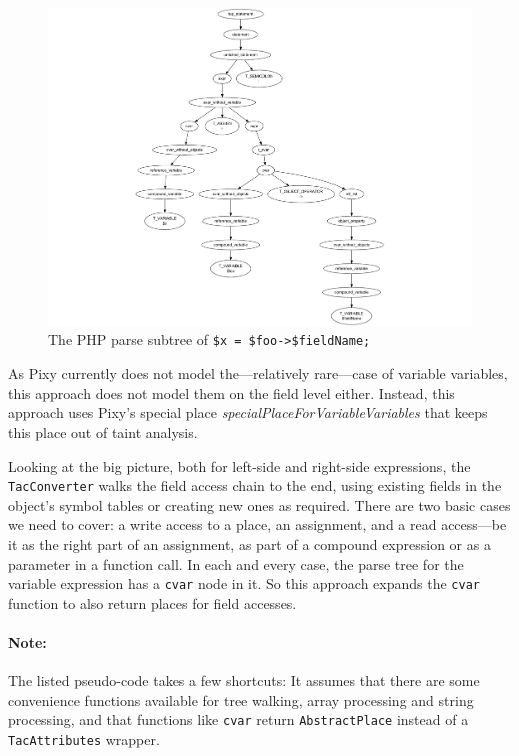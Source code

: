 \begin{figure}[htb]
  \begin{center}
    \includegraphics[scale=.9, trim=60mm 0mm 0mm 0mm]{images/variable-field-access-right}
    \caption{The PHP parse subtree of \texttt{\$x = \$foo->\$fieldName;}}
    \label{fig:variable-field-access-right}
  \end{center}
\end{figure}

As Pixy currently does not model the---relatively rare---case of variable variables, this approach does not model them on the field level either. Instead, this approach uses Pixy's special place \emph{specialPlaceForVariableVariables} that keeps this place out of taint analysis.

Looking at the big picture, both for left-side and right-side expressions, the \texttt{TacConverter} walks the field access chain to the end, using existing fields in the object's symbol tables or creating new ones as required. There are two basic cases we need to cover: a write access to a place, \ie an assignment, and a read access---be it as the right part of an assignment, as part of a compound expression or as a parameter in a function call. In each and every case, the parse tree for the variable expression has a \texttt{cvar} node in it. So this approach expands the \texttt{cvar} function to also return places for field accesses.

\paragraph{Note:} The listed pseudo-code takes a few shortcuts: It assumes that there are some convenience functions available for tree walking, array processing and string processing, and that functions like \texttt{cvar} return \texttt{AbstractPlace} instead of a \texttt{TacAttributes} wrapper.


